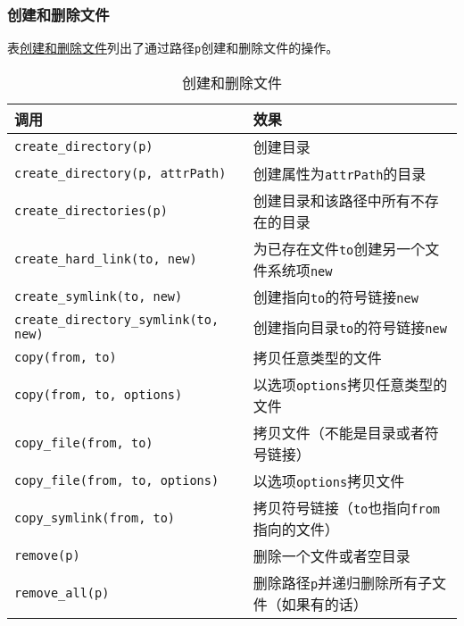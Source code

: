 \subsubsection{创建和删除文件}
表\hyperref[t20.15]{创建和删除文件}列出了通过路径\texttt{p}创建和删除文件的操作。
\begin{table}[ht]
    \centering
    \begin{tabular}{l|l}
        \hline
        \textbf{调用}                                  & \textbf{效果}                              \\
        \hline
        \texttt{create\_directory(p)}                & 创建目录                                     \\
        \texttt{create\_directory(p, attrPath)}      & 创建属性为\texttt{attrPath}的目录                \\
        \texttt{create\_directories(p)}              & 创建目录和该路径中所有不存在的目录                        \\
        \texttt{create\_hard\_link(to, new)}         & 为已存在文件\texttt{to}创建另一个文件系统项\texttt{new}  \\
        \texttt{create\_symlink(to, new)}            & 创建指向\texttt{to}的符号链接\texttt{new}         \\
        \texttt{create\_directory\_symlink(to, new)} & 创建指向目录\texttt{to}的符号链接\texttt{new}       \\
        \texttt{copy(from, to)}                      & 拷贝任意类型的文件                                \\
        \texttt{copy(from, to, options)}             & 以选项\texttt{options}拷贝任意类型的文件             \\
        \texttt{copy\_file(from, to)}                & 拷贝文件（不能是目录或者符号链接）                        \\
        \texttt{copy\_file(from, to, options)}       & 以选项\texttt{options}拷贝文件                  \\
        \texttt{copy\_symlink(from, to)}             & 拷贝符号链接（\texttt{to}也指向\texttt{from}指向的文件） \\
        \texttt{remove(p)}                           & 删除一个文件或者空目录                              \\
        \texttt{remove\_all(p)}                      & 删除路径\texttt{p}并递归删除所有子文件（如果有的话）          \\
        \hline
    \end{tabular}
    \caption{创建和删除文件}
    \label{t20.15}
\end{table}

